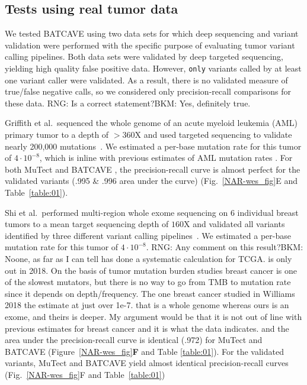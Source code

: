\documentclass[a4,center,fleqn]{NAR}
\newcommand{\rngcomment}[1]{{\color{red}RNG: #1}}
\newcommand{\bkmcomment}[1]{{\color{blue}BKM: #1}}
\newcommand{\batcave}{BATCAVE }
\begin{document}
\subsection{Tests using real tumor data}
We tested \batcave using two data sets for which deep sequencing and variant validation were performed with the specific purpose of evaluating tumor variant calling pipelines.
Both data sets were validated by deep targeted sequencing, yielding high quality false positive data.
However, \texttt{only} variants called by at least one variant caller were validated.
As a result, there is no validated measure of true/false negative calls, so we considered only precision-recall comparisons for these data. \rngcomment{Is  a correct statement?}\bkmcomment{Yes, definitely true.}

Griffith et al.\ sequenced the whole genome of an acute myeloid leukemia (AML) primary tumor to a depth of $>$360X and used targeted sequencing to validate nearly 200,000 mutations~\cite{Griffith2015}.
We estimated a per-base mutation rate for this tumor of $4\cdot10^{-8}$, which is inline with previous estimates of AML mutation rates \cite{Griffith2015,Williams2018}.
For both MuTect and \batcave, the precision-recall curve is almost perfect for the validated variants (.995 \& .996 area under the curve) (Fig.~\ref{NAR-wes_fig}E and Table~\ref{table:01}).

Shi et al.\ performed multi-region whole exome sequencing on 6 individual breast tumors to a mean target sequencing depth of $160\mathrm{X}$ and validated all variants identified by three different variant calling pipelines~\cite{Shi2018}.
We estimated a per-base mutation rate for this tumor of $4\cdot10^{-8}$. \rngcomment{Any comment on this result?}\bkmcomment{Noone, as far as I can tell has done a systematic calculation for TCGA. \cite{Williams2018} is only out in 2018. On the basis of tumor mutation burden studies breast cancer is one of the slowest mutators, but there is no way to go from TMB to mutation rate since it depends on depth/frequency. The one breast cancer studied in Williams 2018 the estimate at just over 1e-7. that is a whole genome whereas ours is an exome, and theirs is deeper. My argument would be that it is not out of line with previous estimates for breast cancer and it is what the data indicates.}
and the area under the precision-recall curve is identical (.972) for MuTect and \batcave (Figure~\ref{NAR-wes_fig}\textbf{F} and Table \ref{table:01}).
For the validated variants, MuTect and \batcave yield almost identical precision-recall curves (Fig.~\ref{NAR-wes_fig}F and Table~\ref{table:01})
\end{document}
